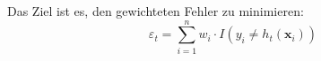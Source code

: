 Das Ziel ist es, den gewichteten Fehler zu minimieren:
$$
    \varepsilon_t = \sum_{i=1}^n w_i\cdot I\left(y_i \neq h_t\left(\boldsymbol{x}_i\right)\right)
$$